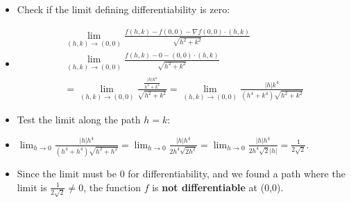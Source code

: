 \begin{cascade}
\begin{itemize}
\begin{itemize}
\begin{itemize}
				            \item Check if the limit defining differentiability is zero:
				            \item \begin{align*}
					                  \lim_{(h,k)\to(0,0)} \frac{f(h,k) - f(0,0) - \nabla f(0,0) \cdot (h,k)}{\sqrt{h^2+k^2}} \\
					                  \lim_{(h,k)\to(0,0)} \frac{f(h,k) - 0 - (0,0) \cdot (h,k)}{\sqrt{h^2+k^2}}              \\
					                  = \lim_{(h,k)\to(0,0)} \frac{\frac{|h|k^4}{h^4+k^4}}{\sqrt{h^2+k^2}} = \lim_{(h,k)\to(0,0)} \frac{|h|k^4}{(h^4+k^4)\sqrt{h^2+k^2}}
				                  \end{align*}
				            \item Test the limit along the path $h=k$:
				            \item $\lim_{h\to 0} \frac{|h|h^4}{(h^4+h^4)\sqrt{h^2+h^2}} = \lim_{h\to 0} \frac{|h|h^4}{2h^4\sqrt{2h^2}} = \lim_{h\to 0} \frac{|h|h^4}{2h^4\sqrt{2}|h|} = \frac{1}{2\sqrt{2}}$.
				            \item Since the limit must be 0 for differentiability, and we found a path where the limit is $\frac{1}{2\sqrt{2}} \neq 0$, the function $f$ is \textbf{not differentiable} at (0,0).
			            \end{itemize}
		      \end{itemize}
	\end{itemize}
\end{cascade}

\hfill

